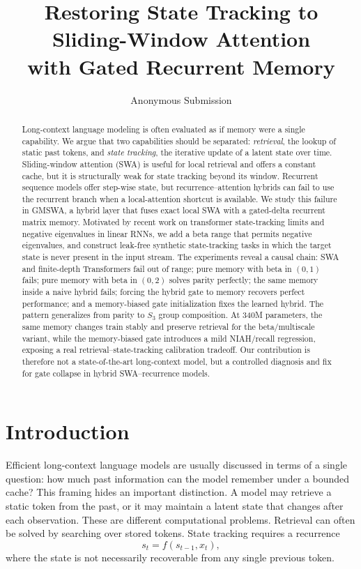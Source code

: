 \documentclass[letterpaper]{article}
\title{Restoring State Tracking to Sliding-Window Attention\\with Gated Recurrent Memory}
\author{Anonymous Submission}
\begin{document}
\maketitle

\begin{abstract}
Long-context language modeling is often evaluated as if memory were a single capability. We argue that two capabilities should be separated: \emph{retrieval}, the lookup of static past tokens, and \emph{state tracking}, the iterative update of a latent state over time. Sliding-window attention (SWA) is useful for local retrieval and offers a constant cache, but it is structurally weak for state tracking beyond its window. Recurrent sequence models offer step-wise state, but recurrence--attention hybrids can fail to use the recurrent branch when a local-attention shortcut is available. We study this failure in GMSWA, a hybrid layer that fuses exact local SWA with a gated-delta recurrent matrix memory. Motivated by recent work on transformer state-tracking limits and negative eigenvalues in linear RNNs, we add a beta range that permits negative eigenvalues, and construct leak-free synthetic state-tracking tasks in which the target state is never present in the input stream. The experiments reveal a causal chain: SWA and finite-depth Transformers fail out of range; pure memory with beta in $(0,1)$ fails; pure memory with beta in $(0,2)$ solves parity perfectly; the same memory inside a naive hybrid fails; forcing the hybrid gate to memory recovers perfect performance; and a memory-biased gate initialization fixes the learned hybrid. The pattern generalizes from parity to $S_3$ group composition. At 340M parameters, the same memory changes train stably and preserve retrieval for the beta/multiscale variant, while the memory-biased gate introduces a mild NIAH/recall regression, exposing a real retrieval--state-tracking calibration tradeoff. Our contribution is therefore not a state-of-the-art long-context model, but a controlled diagnosis and fix for gate collapse in hybrid SWA--recurrence models.
\end{abstract}

\section{Introduction}

Efficient long-context language models are usually discussed in terms of a single question: how much past information can the model remember under a bounded cache? This framing hides an important distinction. A model may retrieve a static token from the past, or it may maintain a latent state that changes after each observation. These are different computational problems. Retrieval can often be solved by searching over stored tokens. State tracking requires a recurrence
\begin{equation}
  s_t = f(s_{t-1}, x_t),
\end{equation}
where the state is not necessarily recoverable from any single previous token.
\end{document}
